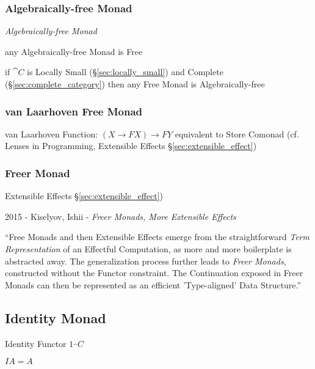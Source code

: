\subsubsection{Algebraically-free Monad}\label{sec:algebraically_free}

\emph{Algebraically-free Monad}

any Algebraically-free Monad is Free

if $\cat{C}$ is Locally Small (\S\ref{sec:locally_small}) and Complete
(\S\ref{sec:complete_category}) then any Free Monad is
Algebraically-free



\subsubsection{van Laarhoven Free Monad}
\label{sec:vanlaarhoven_free_monad}

van Laarhoven Function: $(X \rightarrow F X) \rightarrow F Y$
equivalent to Store Comonad (cf. Lenses in Programming, Extensible
Effects \S\ref{sec:extensible_effect})



\subsubsection{Freer Monad}\label{sec:freer_monad}

Extensible Effects \S\ref{sec:extensible_effect})

2015 - Kiselyov, Ishii - \emph{Freer Monads, More Extensible Effects}

``Free Monads and then Extensible Effects emerge from the straightforward
\emph{Term Representation} of an Effectful Computation, as more and more
boilerplate is abstracted away. The generalization process further leads to
\emph{Freer Monads}, constructed without the Functor constraint. The
Continuation exposed in Freer Monads can then be represented as an efficient
'Type-aligned' Data Structure.''



\subsection{Identity Monad}\label{sec:identity_monad}

Identity Functor $1_\cat{C}$

$I A = A$

